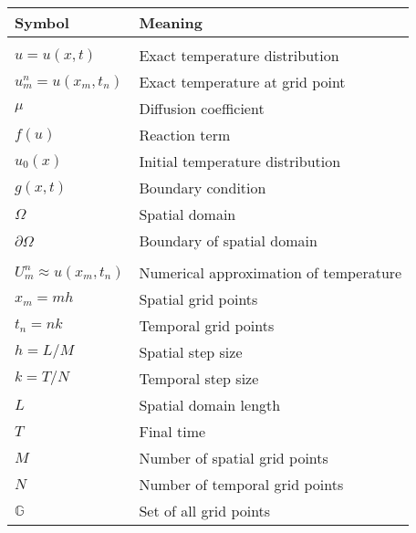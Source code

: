 \begin{tabular}{ll}
  \textbf{Symbol}               & \textbf{Meaning}                       \\
  \hline                                                                 \\[-1em]
  \(u = u(x, t)\)               & Exact temperature distribution         \\
  \(u_m^n = u(x_m, t_n)\)       & Exact temperature at grid point        \\
  \(\mu\)                       & Diffusion coefficient                  \\
  \(f(u)\)                      & Reaction term                          \\
  \(u_0(x)\)                    & Initial temperature distribution       \\
  \(g(x, t)\)                   & Boundary condition                     \\
  \(\Omega\)                    & Spatial domain                         \\
  \(\partial \Omega\)           & Boundary of spatial domain             \\
  \hline                                                                 \\[-1em]
  \(U_m^n \approx u(x_m, t_n)\) & Numerical approximation of temperature \\
  \(x_m = m h\)                 & Spatial grid points                    \\
  \(t_n = n k\)                 & Temporal grid points                   \\
  \(h = L/M\)                   & Spatial step size                      \\
  \(k =T/N\)                    & Temporal step size                     \\
  \(L\)                         & Spatial domain length                  \\
  \(T\)                         & Final time                             \\
  \(M\)                         & Number of spatial grid points          \\
  \(N\)                         & Number of temporal grid points         \\
  \(\mathbb{G}\)                & Set of all grid points                 \\
  \hline
\end{tabular}
